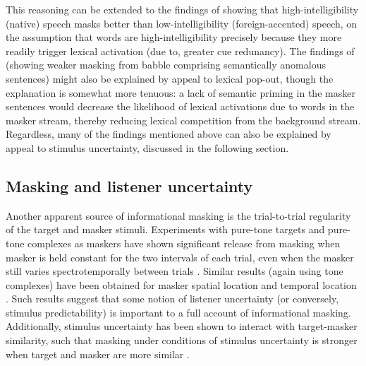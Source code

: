 This reasoning can be extended to the findings of \citeauthor{CalandruccioEtAl2010} showing that high-intelligibility (native) speech masks better than low-intelligibility (foreign-accented) speech, on the assumption that words are high-intelligibility precisely because they more readily trigger lexical activation (due to, \eg{} greater cue redunancy).  The findings of \citeauthor{BrouwerEtAl2012} (showing weaker masking from babble comprising semantically anomalous sentences) might also be explained by appeal to lexical pop-out, though the explanation is somewhat more tenuous: a lack of semantic priming in the masker sentences would decrease the likelihood of lexical activations due to words in the masker stream, thereby reducing lexical competition from the background stream.  Regardless, many of the findings mentioned above can also be explained by appeal to stimulus uncertainty, discussed in the following section. %

\subsection{Masking and listener uncertainty\label{sec:uncertainty}}
Another apparent source of informational masking is the trial-to-trial regularity of the target and masker stimuli.  Experiments with pure-tone targets and pure-tone complexes as maskers have shown significant release from masking when masker is held constant for the two intervals of each trial, even when the masker still varies spectrotemporally between trials \citep{NeffGreen1987, NeffCallahan1988}.  Similar results (again using tone complexes) have been obtained for masker spatial location \citep{FanEtAl2008} and temporal location \citep{BoninoLeibold2008}.  Such results suggest that some notion of listener uncertainty (or conversely, stimulus predictability) is important to a full account of informational masking.  Additionally, stimulus uncertainty has been shown to interact with target-masker similarity, such that masking under conditions of stimulus uncertainty is stronger when target and masker are more similar \citep{DurlachEtAl2003b}.

